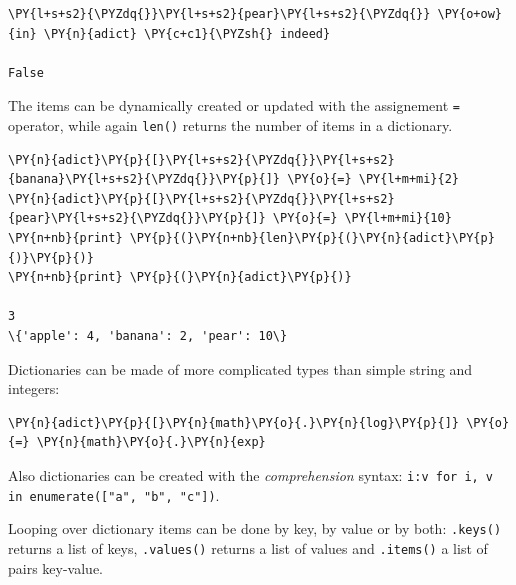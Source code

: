 \begin{tcolorbox}[breakable, size=fbox, boxrule=1pt, pad at break*=1mm, colback=cellbackground, colframe=cellborder]
\begin{Verbatim}[commandchars=\\\{\}]
\PY{l+s+s2}{\PYZdq{}}\PY{l+s+s2}{pear}\PY{l+s+s2}{\PYZdq{}} \PY{o+ow}{in} \PY{n}{adict} \PY{c+c1}{\PYZsh{} indeed}

False
\end{Verbatim}
\end{tcolorbox}

The items can be dynamically created or updated with the assignement \texttt{=} operator, while again \texttt{len()} returns the number of items in a dictionary.

\begin{tcolorbox}[breakable, size=fbox, boxrule=1pt, pad at break*=1mm, colback=cellbackground, colframe=cellborder]
\begin{Verbatim}[commandchars=\\\{\}]
\PY{n}{adict}\PY{p}{[}\PY{l+s+s2}{\PYZdq{}}\PY{l+s+s2}{banana}\PY{l+s+s2}{\PYZdq{}}\PY{p}{]} \PY{o}{=} \PY{l+m+mi}{2}
\PY{n}{adict}\PY{p}{[}\PY{l+s+s2}{\PYZdq{}}\PY{l+s+s2}{pear}\PY{l+s+s2}{\PYZdq{}}\PY{p}{]} \PY{o}{=} \PY{l+m+mi}{10}
\PY{n+nb}{print} \PY{p}{(}\PY{n+nb}{len}\PY{p}{(}\PY{n}{adict}\PY{p}{)}\PY{p}{)}
\PY{n+nb}{print} \PY{p}{(}\PY{n}{adict}\PY{p}{)}

3
\{'apple': 4, 'banana': 2, 'pear': 10\}
\end{Verbatim}
\end{tcolorbox}

Dictionaries can be made of more complicated types than simple string and integers:

\begin{tcolorbox}[breakable, size=fbox, boxrule=1pt, pad at break*=1mm, colback=cellbackground, colframe=cellborder]
\begin{Verbatim}[commandchars=\\\{\}]
\PY{n}{adict}\PY{p}{[}\PY{n}{math}\PY{o}{.}\PY{n}{log}\PY{p}{]} \PY{o}{=} \PY{n}{math}\PY{o}{.}\PY{n}{exp}
\end{Verbatim}
\end{tcolorbox}

Also dictionaries can be created with the \emph{comprehension} syntax: \texttt{{i:v for i, v in enumerate(["a", "b", "c"])}}.

Looping over dictionary items can be done by key, by value or by both: \texttt{.keys()} returns a list of keys, \texttt{.values()} returns a list of values and \texttt{.items()} a list of pairs key-value.

